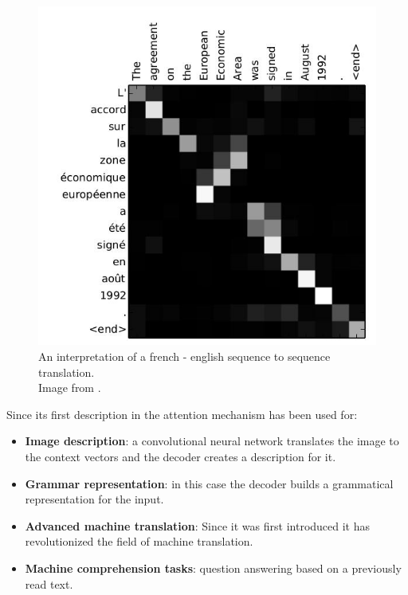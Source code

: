 \begin{figure}[!htb]
	\centering
	\includegraphics[scale=0.5]{interpretation.jpg}
	\caption{An interpretation of a french - english sequence to sequence translation.\\Image from \cite{Bahdanau:2015}.}
	\label{fig:interpretation}
\end{figure}

\begin{minipage}{\linewidth}
	Since its first description in \cite{Bahdanau:2015} the attention mechanism has been used for:
	\begin{itemize}
		\item \textbf{Image description}: a convolutional neural network translates the image to the context vectors and the decoder creates a description for it.
		\item \textbf{Grammar representation}: in this case the decoder builds a grammatical representation for the input.
		\item \textbf{Advanced machine translation}: Since it was first introduced it has revolutionized the field of machine translation.
		\item \textbf{Machine comprehension tasks}: question answering based on a previously read text.
	\end{itemize}
\end{minipage}